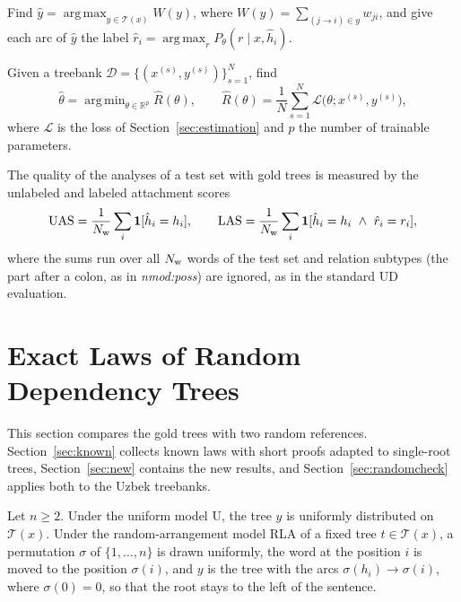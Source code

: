 \documentclass[mathematics,article,submit,pdftex,oneauthor]{Definitions/mdpi}
\newcommand{\T}{\mathcal T}
\newcommand{\R}{\mathbb R}
\DeclareMathOperator*{\argmax}{arg\,max}
\DeclareMathOperator*{\argmin}{arg\,min}
\begin{document}
\begin{Problem}[Decoding]\label{prob:decode}
Find $\hat y=\argmax_{y\in\T(x)}W(y)$, where $W(y)=\sum_{(j\to i)\in y}w_{ji}$, and give each arc of $\hat y$ the label $\hat r_i=\argmax_{r}P_\theta(r\mid x,\hat h_i)$.
\end{Problem}

\begin{Problem}[Estimation]\label{prob:estimate}
Given a treebank $\mathcal D=\{(x^{(s)},y^{(s)})\}_{s=1}^{N}$, find
\begin{equation}\label{eq:estimate}
\hat\theta=\argmin_{\theta\in\R^{p}}\widehat R(\theta),\qquad \widehat R(\theta)=\frac{1}{N}\sum_{s=1}^{N}\mathcal L\bigl(\theta;x^{(s)},y^{(s)}\bigr),
\end{equation}
where $\mathcal L$ is the loss of Section~\ref{sec:estimation} and $p$ the number of trainable parameters.
\end{Problem}

The quality of the analyses of a test set with gold trees is measured by the unlabeled and labeled attachment scores
\begin{equation}\label{eq:las}
\mathrm{UAS}=\frac{1}{N_{\rm w}}\sum_{i}\mathbf 1[\hat h_i=h_i],\qquad
\mathrm{LAS}=\frac{1}{N_{\rm w}}\sum_{i}\mathbf 1[\hat h_i=h_i\ \wedge\ \hat r_i=r_i],
\end{equation}
where the sums run over all $N_{\rm w}$ words of the test set and relation subtypes (the part after a colon, as in \textit{nmod:poss}) are ignored, as in the standard UD evaluation.

\section{Exact Laws of Random Dependency Trees}\label{sec:random}

This section compares the gold trees with two random references.
Section~\ref{sec:known} collects known laws with short proofs adapted to single-root trees, Section~\ref{sec:new} contains the new results, and Section~\ref{sec:randomcheck} applies both to the Uzbek treebanks.

\begin{Definition}\label{def:null}
Let $n\geqslant2$.
Under the uniform model U, the tree $y$ is uniformly distributed on $\T(x)$.
Under the random-arrangement model RLA of a fixed tree $t\in\T(x)$, a permutation $\sigma$ of $\{1,\dots,n\}$ is drawn uniformly, the word at the position $i$ is moved to the position $\sigma(i)$, and $y$ is the tree with the arcs $\sigma(h_i)\to\sigma(i)$, where $\sigma(0)=0$, so that the root stays to the left of the sentence.
\end{Definition}
\end{document}

